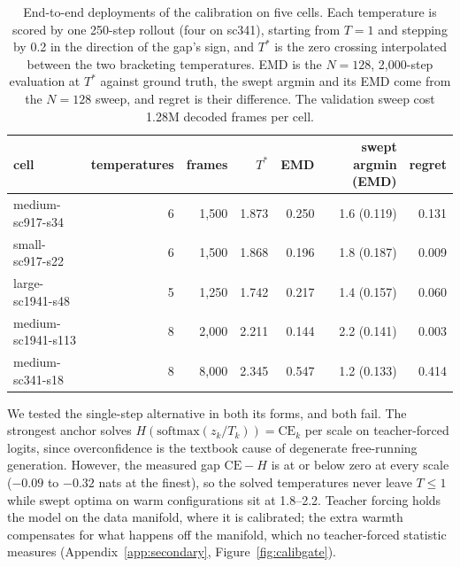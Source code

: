 \documentclass{article}
\begin{document}
\begin{table}[!htb]
\centering\small
\caption{End-to-end deployments of the calibration on five cells. Each temperature is scored by
one 250-step rollout (four on sc341), starting from $T{=}1$ and stepping by 0.2 in the
direction of the gap's sign, and $T^\ast$ is the zero crossing interpolated between the two
bracketing temperatures. EMD is the $N{=}128$, 2{,}000-step evaluation at $T^\ast$ against
ground truth, the swept argmin and its EMD come from the $N{=}128$ sweep, and regret is
their difference. The validation sweep cost 1.28M decoded frames per cell.}
\begin{tabular}{lrrrrrr}
\toprule
cell & temperatures & frames & $T^\ast$ & EMD & swept argmin (EMD) & regret \\
\midrule
medium-sc917-s34 & 6 & 1{,}500 & 1.873 & 0.250 & 1.6 (0.119) & 0.131 \\
small-sc917-s22 & 6 & 1{,}500 & 1.868 & 0.196 & 1.8 (0.187) & 0.009 \\
large-sc1941-s48 & 5 & 1{,}250 & 1.742 & 0.217 & 1.4 (0.157) & 0.060 \\
medium-sc1941-s113 & 8 & 2{,}000 & 2.211 & 0.144 & 2.2 (0.141) & 0.003 \\
medium-sc341-s18 & 8 & 8{,}000 & 2.345 & 0.547 & 1.2 (0.133) & 0.414 \\
\bottomrule
\end{tabular}
\label{tab:deploy}
\end{table}

We tested the single-step alternative in both its forms, and both fail. The strongest
anchor solves
$H(\mathrm{softmax}(z_k/T_k)) = \mathrm{CE}_k$ per scale on teacher-forced
logits\label{sec:gate}, since overconfidence is the textbook cause of degenerate
free-running generation. However, the measured gap $\mathrm{CE}-H$ is at or below zero at
every scale ($-0.09$ to $-0.32$ nats at the finest), so the solved temperatures never leave
$T\leq 1$ while swept optima on warm configurations sit at 1.8--2.2. Teacher forcing holds
the model on the data manifold, where it is calibrated; the extra warmth compensates for
what happens off the manifold, which no teacher-forced statistic measures
(Appendix~\ref{app:secondary}, Figure~\ref{fig:calibgate}). 
\end{document}
